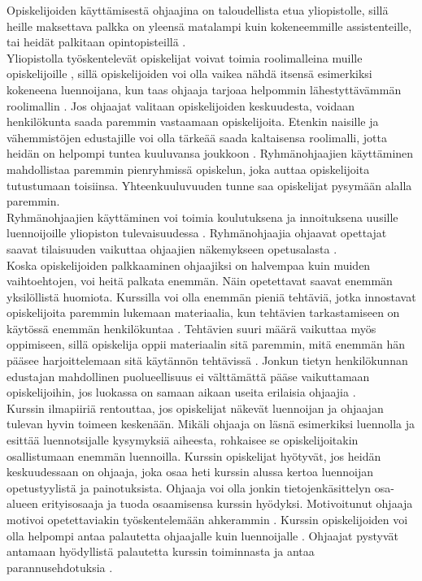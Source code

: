 \documentclass[finnish]{tktltiki2}
\theoremstyle{definition}
\theoremstyle{remark}
\begin{document}
Opiskelijoiden käyttämisestä ohjaajina on taloudellista etua yliopistolle, sillä heille maksettava palkka on yleensä matalampi kuin kokeneemmille assistenteille, tai heidät palkitaan opintopisteillä \cite{Reges88}.
\\
Yliopistolla työskentelevät opiskelijat voivat toimia roolimalleina muille opiskelijoille \cite{Roberts95, Tashakkori05}, sillä opiskelijoiden voi olla vaikea nähdä itsensä esimerkiksi kokeneena luennoijana, kun taas ohjaaja tarjoaa helpommin lähestyttävämmän roolimallin \cite{Roberts02}. Jos ohjaajat valitaan opiskelijoiden keskuudesta, voidaan henkilökunta saada paremmin vastaamaan opiskelijoita. Etenkin naisille ja vähemmistöjen edustajille voi olla tärkeää saada kaltaisensa roolimalli, jotta heidän on helpompi tuntea kuuluvansa joukkoon \cite{Morgan02}. Ryhmänohjaajien käyttäminen mahdollistaa paremmin pienryhmissä opiskelun, joka auttaa opiskelijoita tutustumaan toisiinsa. Yhteenkuuluvuuden tunne saa opiskelijat pysymään alalla paremmin.
\\
Ryhmänohjaajien käyttäminen voi toimia koulutuksena ja innoituksena uusille luennoijoille yliopiston tulevaisuudessa \cite{Roberts95, Morgan02}. Ryhmänohjaajia ohjaavat opettajat saavat tilaisuuden vaikuttaa ohjaajien näkemykseen opetusalasta \cite{Morgan02}.
\\
Koska opiskelijoiden palkkaaminen ohjaajiksi on halvempaa kuin muiden vaihtoehtojen, voi heitä palkata enemmän. Näin opetettavat saavat enemmän yksilöllistä huomiota. Kurssilla voi olla enemmän pieniä tehtäviä, jotka innostavat opiskelijoita paremmin lukemaan materiaalia, kun tehtävien tarkastamiseen on käytössä enemmän henkilökuntaa \cite{Dickson11}. Tehtävien suuri määrä vaikuttaa myös oppimiseen, sillä opiskelija oppii materiaalin sitä paremmin, mitä enemmän hän pääsee harjoittelemaan sitä käytännön tehtävissä \cite{Vikberg}. Jonkun tietyn henkilökunnan edustajan mahdollinen puolueellisuus ei välttämättä pääse vaikuttamaan opiskelijoihin, jos luokassa on samaan aikaan useita erilaisia ohjaajia \cite{Morgan02}.
\\
Kurssin ilmapiiriä rentouttaa, jos opiskelijat näkevät luennoijan ja ohjaajan tulevan hyvin toimeen keskenään. Mikäli ohjaaja on läsnä esimerkiksi luennolla ja esittää luennotsijalle kysymyksiä aiheesta, rohkaisee se opiskelijoitakin osallistumaan enemmän luennoilla. Kurssin opiskelijat hyötyvät, jos heidän keskuudessaan on ohjaaja, joka osaa heti kurssin alussa kertoa luennoijan opetustyylistä ja painotuksista. Ohjaaja voi olla jonkin tietojenkäsittelyn osa-alueen erityisosaaja ja tuoda osaamisensa kurssin hyödyksi. Motivoitunut ohjaaja motivoi opetettaviakin työskentelemään ahkerammin \cite{Dickson11}. Kurssin opiskelijoiden voi olla helpompi antaa palautetta ohjaajalle kuin luennoijalle \cite{Morgan02}. Ohjaajat pystyvät antamaan hyödyllistä palautetta kurssin toiminnasta ja antaa parannusehdotuksia \cite{Decker06}.
\end{document}
